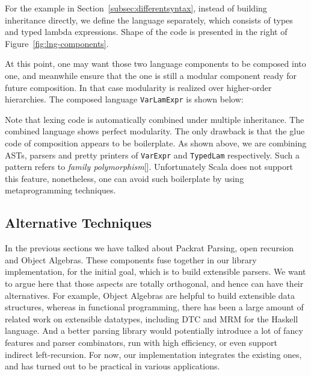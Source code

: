For the example in Section~\ref{subsec:differentsyntax}, instead of building inheritance directly, we define the language separately,
which consists of types and typed lambda expressions. Shape of the code is presented in the right of Figure~\ref{fig:lng-components}.

At this point, one may want those two language components to be composed into one, and meanwhile ensure that the one is still a modular
component ready for future composition. In that case modularity is realized over higher-order hierarchies. The composed language \lstinline{VarLamExpr}
is shown below:

Note that lexing code is automatically combined under multiple inheritance. The combined language shows perfect modularity. The only
drawback is that the glue code of composition appears to be boilerplate. As shown above, we are combining ASTs, parsers and pretty printers of
\lstinline{VarExpr} and \lstinline{TypedLam} respectively. Such a pattern refers to \textit{family polymorphism}[]. Unfortunately Scala does not
support this feature, nonetheless, one can avoid such boilerplate by using metaprogramming techniques.

\subsection{Alternative Techniques}
In the previous sections we have talked about Packrat Parsing, open recursion and Object Algebras. These components fuse together in our library implementation, for the initial goal, which is to build extensible parsers. We want to argue here that those aspects are totally orthogonal, and hence can have their alternatives. For example, Object Algebras are helpful to build extensible data structures, whereas in functional programming, there has been a large amount of related work on extensible datatypes, including DTC and MRM for the Haskell language. And a better
parsing library would potentially introduce a lot of fancy features and parser combinators, run with high efficiency, or even support indirect left-recursion.
 For now, our implementation integrates the existing ones, and has turned out to be practical in various applications.
